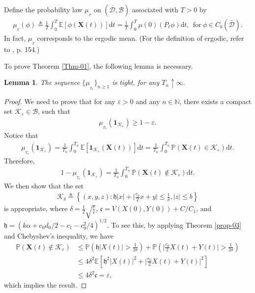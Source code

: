 \documentclass[12pt]{article}
\numberwithin{equation}{section}
\newtheorem{lemma}[theorem]{Lemma}
\def \E{\mathbb E}
\def \N{\mathbb N}
\def \P{\mathbb P}
\def\d{\mathrm{d}}
\newcommand{\indic}{\mathbf{1}}
\begin{document}
Define the probability law $\mu_{_T}$ on $(\bar{\mathcal{D}}, \mathcal{B})$ associated with $T>0$ by
\begin{align*}
	\mu_{_T}(\phi) \triangleq \frac{1}{T}\int_{0}^{T}\E[\phi (\mathbf{X}(t))]\d t 
	=  \frac{1}{T}\int_{0}^{T} \mu(0) (P_{t}\phi) \d t, ~~\text{for}~\phi\in	C_{b}(\bar{\mathcal{D}}). 
\end{align*}
In fact, $\mu_{_T}$ corresponds to the ergodic mean. 
(For the definition of ergodic, refer to \cite{PK92}, p. 154.)

To prove Theorem \ref{Thm-01}, the following lemma is necessary. 
\begin{lemma}\label{lemma-02}
	The sequence $\{\mu_{_{T_{n}}}\}_{n\geq 1}$ is tight, for any $T_{n}\uparrow \infty$. 
\end{lemma}
 
\begin{proof}
	We need to prove that for any $\varepsilon>0$ and any $n\in\N$, 
	there exists a compact set $\mathcal{K}_{\varepsilon}\in\mathcal{B}$, 
	such that
	\begin{align*}
		\mu_{_{T_{n}}}(\indic_{\mathcal{K}_{\varepsilon}})\geq 1-\varepsilon. 
	\end{align*}
	Notice that 
	\begin{align*}
		\mu_{_{T_{n}}}(\indic_{\mathcal{K}_{\varepsilon}})
		= \frac{1}{T_{n}}\int_{0}^{T_{n}}\E[\indic_{\mathcal{K}_{\varepsilon}}(\mathbf{X}(t))]\d t 
		= \frac{1}{T_{n}}\int_{0}^{T_{n}}\P (\mathbf{X}(t) \in \mathcal{K}_{\varepsilon}) \d t. 
	\end{align*}
	Therefore,
	\begin{align*}
		1 - \mu_{_{T_{n}}}(\indic_{\mathcal{K}_{\varepsilon}})
		= \frac{1}{T_{n}}\int_{0}^{T_{n}}\P (\mathbf{X}(t) \notin \mathcal{K}_{\varepsilon}) \d t. 
	\end{align*}
	We then show that the set 
	\begin{align*}
		\mathcal{K}_{\delta} \triangleq 
		\left\{ (x,y,z) : \mathfrak{h} |x| + \Big|\frac{c_{0}}{2}x + y\Big| \leq \frac{1}{\delta}, |z| \leq b\right\} 
	\end{align*}
	is appropriate, where $\delta = \frac{1}{2}\sqrt{\frac{\varepsilon}{ \mathfrak{c}}}$, 
	$ \mathfrak{c} = V(X(0), Y(0)) + C/C_{1}$, and 
	$\mathfrak{h} = \left( k\alpha + c_{0}d_{0}/2 - c_{1} - c_{0}^{2}/4\right)^{1/2}$. 
	To see this, by applying Theorem \ref{prop-03} and Chebyshev's inequality, we have
	\begin{align*}
		\P (\mathbf{X}(t) \notin \mathcal{K}_{\varepsilon}) 
		& \leq 
		\P\left(\mathfrak{h} |X(t)| > \frac{1}{2\delta}\right) + \P\left(\Big|\frac{c_{0}}{2}X(t) + Y(t)\Big| > \frac{1}{2\delta}\right)\\
		& \leq 4\delta^{2}\E\left[\mathfrak{h}^{2} |X(t)|^{2} +  \Big|\frac{c_{0}}{2}X(t) + Y(t)\Big|^{2}\right]\\
		& \leq 4\delta^{2} \mathfrak{c} = \varepsilon,
	\end{align*}
	which implies the result. 
\end{proof}
\end{document}
